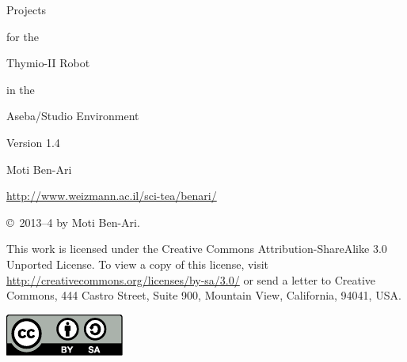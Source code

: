 \thispagestyle{empty}

\begin{center}
\begin{bfseries}
\begin{LARGE}
Projects 

for the 

Thymio-II Robot

in the 

Aseba/Studio Environment

\bigskip
\end{LARGE}

\begin{large}
Version 1.4
\end{large}

\begin{LARGE}
\bigskip\bigskip\bigskip\bigskip

Moti Ben-Ari

\bigskip
\end{LARGE}

\begin{large}
\url{http://www.weizmann.ac.il/sci-tea/benari/}
\end{large}
\end{bfseries}
\end{center}

\vfill

\begin{center}
\copyright{}\  2013--4 by Moti Ben-Ari. 
\end{center}

This work is licensed under the Creative Commons
Attribution-ShareAlike 3.0 Unported License. To view a copy
of this license, visit
\url{http://creativecommons.org/licenses/by-sa/3.0/}
or send a letter to Creative Commons, 444 Castro Street, Suite 900,
Mountain View, California, 94041, USA.

\begin{center}
\includegraphics[width=.2\textwidth]{../images/by-sa}
\end{center}

\tableofcontents
\thispagestyle{empty}
